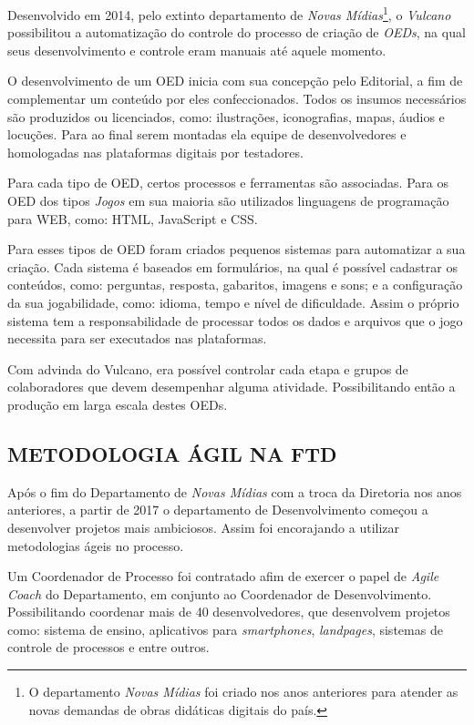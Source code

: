 \documentclass[
  12pt,				%
  openany,
  oneside,
  a4paper,			%
  english,			%
  brazil
]{article}
\numberwithin{figure}{section}
\numberwithin{table}{section}
\begin{document}
Desenvolvido em 2014, pelo extinto departamento de \textit{Novas Mídias}\footnote{O departamento \textit{Novas Mídias} foi criado nos anos anteriores para atender as novas demandas de obras didáticas digitais do país.}, o \textit{Vulcano} possibilitou a automatização do controle do processo de criação de \textit{OEDs}, na qual seus desenvolvimento e controle eram manuais até aquele momento. 

O desenvolvimento de um OED inicia com sua concepção pelo Editorial, a fim de complementar um conteúdo por eles confeccionados. Todos os insumos necessários são produzidos ou licenciados, como: ilustrações, iconografias, mapas, áudios e locuções. Para ao final serem montadas ela equipe de desenvolvedores e homologadas nas plataformas digitais por testadores.

Para cada tipo de OED, certos processos e ferramentas são associadas. Para os OED dos tipos \textit{Jogos} em sua maioria são utilizados linguagens de programação para WEB, como: HTML, JavaScript e CSS.

Para esses tipos de OED foram criados pequenos sistemas para automatizar a sua criação. Cada sistema é baseados em formulários, na qual é possível cadastrar os conteúdos, como: perguntas, resposta, gabaritos, imagens e sons; e a configuração da sua jogabilidade, como: idioma, tempo e nível de dificuldade. Assim o próprio sistema tem a responsabilidade de processar todos os dados e arquivos que o jogo necessita para ser executados nas plataformas.

Com advinda do Vulcano, era possível controlar cada etapa e grupos de colaboradores que devem desempenhar alguma atividade. Possibilitando então a produção em larga escala destes OEDs.


\subsection{METODOLOGIA ÁGIL NA FTD}

Após o fim do Departamento de \textit{Novas Mídias} com a troca da Diretoria nos anos anteriores, a partir de 2017 o departamento de Desenvolvimento começou a desenvolver projetos mais ambiciosos. Assim foi encorajando a utilizar metodologias ágeis no processo.

Um Coordenador de Processo foi contratado afim de exercer o papel de \textit{Agile Coach} do Departamento, em conjunto ao Coordenador de Desenvolvimento. Possibilitando coordenar mais de 40 desenvolvedores, que desenvolvem projetos como: sistema de ensino, aplicativos para \textit{smartphones}, \textit{landpages}, sistemas  de controle de processos e entre outros.
\end{document}
